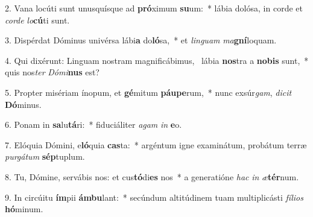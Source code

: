 2. Vana locúti sunt unusquísque ad \textbf{pró}ximum \textbf{su}um:~*  lábia dolósa, in corde et \textit{cor}\textit{de} \textit{lo}\textbf{cú}ti sunt.\

3. Dispérdat Dóminus univérsa lábi\textbf{a} do\textbf{ló}sa,~*  et \textit{lin}\textit{guam} \textit{ma}\textbf{gní}loquam.\

4. Qui dixérunt: Linguam nostram magnificábimus, \dag\  lábia \textbf{nos}tra a \textbf{no}\textbf{bis} sunt,~*  quis nos\textit{ter} \textit{Dó}\textit{mi}\textbf{nus} est?\

5. Propter misériam ínopum, et \textbf{gé}mitum \textbf{páu}\textbf{pe}rum,~*  nunc exsúr\textit{gam}, \textit{di}\textit{cit} \textbf{Dó}minus.\

6. Ponam in \textbf{sa}lu\textbf{tá}ri:~*  fiduciáliter \textit{a}\textit{gam} \textit{in} \textbf{e}o.\

7. Elóquia Dómini, e\textbf{ló}quia \textbf{cas}ta:~*  argéntum igne examinátum, probátum terræ \textit{pur}\textit{gá}\textit{tum} \textbf{sép}tuplum.\

8. Tu, Dómine, servábis nos: et cus\textbf{tó}di\textbf{es} nos~*  a generatióne \textit{hac} \textit{in} \textit{æ}\textbf{tér}num.\

9. In circúitu \textbf{ím}pii \textbf{ám}\textbf{bu}lant:~*  secúndum altitúdinem tuam multiplicásti \textit{fí}\textit{li}\textit{os} \textbf{hó}minum.\

